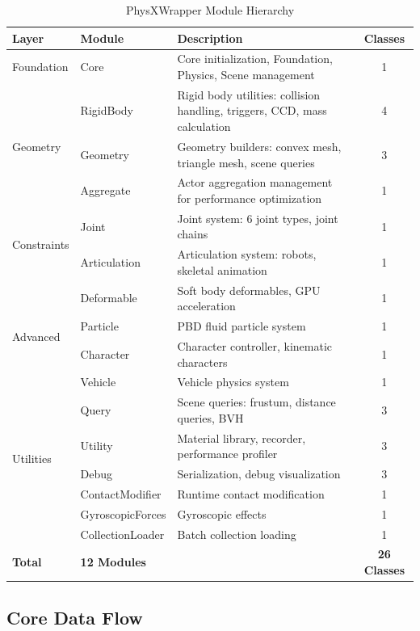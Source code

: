 \begin{table}[h]
\centering
\caption{PhysXWrapper Module Hierarchy}
\begin{tabular}{|l|l|p{6cm}|c|}
\hline
\textbf{Layer} & \textbf{Module} & \textbf{Description} & \textbf{Classes} \\
\hline
\hline
\multirow{1}{*}{Foundation} & Core & Core initialization, Foundation, Physics, Scene management & 1 \\
\hline
\multirow{3}{*}{Geometry} & RigidBody & Rigid body utilities: collision handling, triggers, CCD, mass calculation & 4 \\
& Geometry & Geometry builders: convex mesh, triangle mesh, scene queries & 3 \\
& Aggregate & Actor aggregation management for performance optimization & 1 \\
\hline
\multirow{2}{*}{Constraints} & Joint & Joint system: 6 joint types, joint chains & 1 \\
& Articulation & Articulation system: robots, skeletal animation & 1 \\
\hline
\multirow{4}{*}{Advanced} & Deformable & Soft body deformables, GPU acceleration & 1 \\
& Particle & PBD fluid particle system & 1 \\
& Character & Character controller, kinematic characters & 1 \\
& Vehicle & Vehicle physics system & 1 \\
\hline
\multirow{5}{*}{Utilities} & Query & Scene queries: frustum, distance queries, BVH & 3 \\
& Utility & Material library, recorder, performance profiler & 3 \\
& Debug & Serialization, debug visualization & 3 \\
& ContactModifier & Runtime contact modification & 1 \\
& GyroscopicForces & Gyroscopic effects & 1 \\
& CollectionLoader & Batch collection loading & 1 \\
\hline
\textbf{Total} & \textbf{12 Modules} & & \textbf{26 Classes} \\
\hline
\end{tabular}
\end{table}

\subsection{Core Data Flow}

